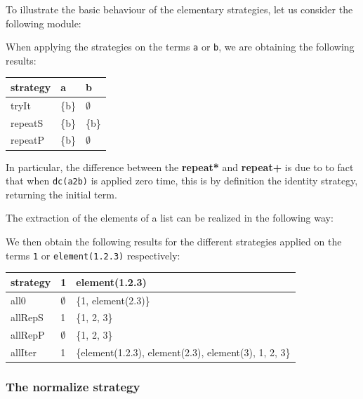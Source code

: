 \EX


To illustrate the basic behaviour of the elementary strategies, let us
consider the following module:

When applying the strategies on the terms \texttt{a} or \texttt{b}, we
are obtaining the following results:\\ 
\begin{center}
{\tt \begin{tabular}{|l||l|l|}
\hline
{\rm strategy}& a     & b             \\
\hline
tryIt   & \{b\} & $\emptyset$   \\
\hline
repeatS & \{b\} & \{b\}         \\
\hline
repeatP & \{b\} & $\emptyset$   \\
\hline
\end{tabular}}
\end{center}
In particular, the difference between the {\bf repeat*} and {\bf
repeat+} is due to to fact that when {\tt dc(a2b)} is applied
zero time, this is by definition the identity strategy, returning the
initial term.

\FEX

\EX The extraction of the elements of a list can be realized in the
following way: 

We then obtain the following results for the different strategies applied on the terms
\texttt{1} or \texttt{element(1.2.3)} respectively:\\
\begin{center}
{\tt \begin{tabular}{|l||l|l|}
\hline
{\rm strategy}        & 1             & element(1.2.3)        \\
\hline
all0    & $\emptyset$   & \{1, element(2.3)\}   \\
\hline
allRepS & 1             & \{1, 2, 3\}   \\
\hline
allRepP & $\emptyset$   & \{1, 2, 3\}   \\
\hline
allIter & 1             &  \{element(1.2.3), element(2.3), element(3), 1, 2, 3\}\\
\hline
\end{tabular}}
\end{center}

\FEX

\subsubsection{The normalize strategy}

